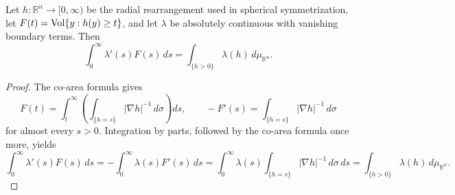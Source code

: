 \begin{proposition}
\label{prop:chow-iii-appj-solution-22-18}


Let \(h:\mathbb R^n\to[0,\infty)\) be the radial rearrangement used in
spherical symmetrization, let
\(F(t)=\operatorname{Vol}\{y:h(y)\geq t\}\), and let \(\lambda\) be absolutely continuous
with vanishing boundary terms.  Then
\[
 \int_0^\infty\lambda'(s)F(s)\,ds
 =\int_{\{h>0\}}\lambda(h)\,d\mu_{\mathbb R^n}.
\]
\end{proposition}
\begin{proof}
\sketch
The co-area formula gives
\[
 F(t)=\int_t^\infty\left(\int_{\{h=s\}}|\nabla h|^{-1}\,d\sigma\right)ds,
 \qquad
 -F'(s)=\int_{\{h=s\}}|\nabla h|^{-1}\,d\sigma
\]
for almost every \(s>0\).  Integration by parts, followed by the co-area
formula once more, yields
\[
 \int_0^\infty\lambda'(s)F(s)\,ds
 =-\int_0^\infty\lambda(s)F'(s)\,ds
 =\int_0^\infty\lambda(s)
   \int_{\{h=s\}}|\nabla h|^{-1}\,d\sigma\,ds
 =\int_{\{h>0\}}\lambda(h)\,d\mu_{\mathbb R^n}.
\]
\end{proof}

